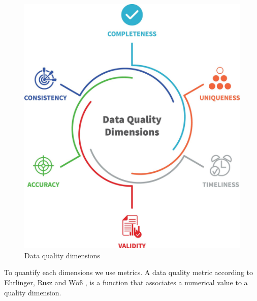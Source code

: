 \begin{figure}[H]
  \caption{Data quality dimensions}  \label{fig:dama_uk}
  \begin{center}
    \includegraphics[scale=0.5]{Main/Static/data_quality_dimensions.jpg} 
  \end{center}
\end{figure}
To quantify each dimensions we use metrics. A data quality metric according to Ehrlinger, Rusz and Wöß \cite{ehrlinger2019survey}, is a function that associates a numerical value to a quality dimension. 
